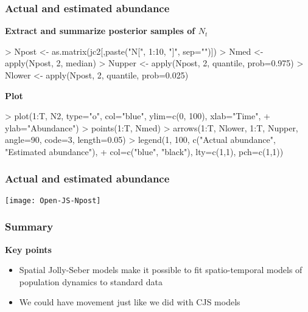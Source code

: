 \documentclass[color=usenames,dvipsnames]{beamer}
\begin{document}
\begin{frame}[fragile]
  \frametitle{Actual and estimated abundance}
  {\bf Extract and summarize posterior samples of $N_t$}
  \footnotesize
\begin{Schunk}
\begin{Sinput}
> Npost <- as.matrix(jc2[,paste("N[", 1:10, "]", sep="")])
> Nmed <- apply(Npost, 2, median)
> Nupper <- apply(Npost, 2, quantile, prob=0.975)
> Nlower <- apply(Npost, 2, quantile, prob=0.025)
\end{Sinput}
\end{Schunk}
  \pause
  \vfill
  {\bf \normalsize Plot}
\begin{Schunk}
\begin{Sinput}
> plot(1:T, N2, type="o", col="blue", ylim=c(0, 100), xlab="Time",
+      ylab="Abundance")
> points(1:T, Nmed)
> arrows(1:T, Nlower, 1:T, Nupper, angle=90, code=3, length=0.05)
> legend(1, 100, c("Actual abundance", "Estimated abundance"),
+        col=c("blue", "black"), lty=c(1,1), pch=c(1,1))
\end{Sinput}
\end{Schunk}
\end{frame}





\begin{frame}
  \frametitle{Actual and estimated abundance}
  \vspace{-4mm}
  \begin{center}
    \texttt{[image: Open-JS-Npost]}
  \end{center}
\end{frame}










\begin{frame}
  \frametitle{Summary}
  \large
  {\bf Key points}
  \begin{itemize}[<+->]
    \item Spatial Jolly-Seber models make it possible to fit
      spatio-temporal models of population dynamics to standard data
    \item We could have movement just like we did with CJS models
  \end{itemize}
\end{frame}
\end{document}

